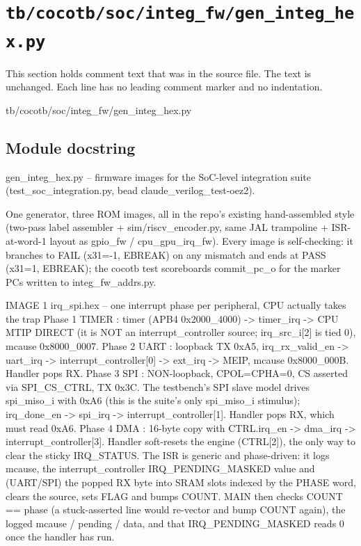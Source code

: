 \section{\texttt{tb/cocotb/soc/integ\_fw/gen\_integ\_hex.py}}\label{tm:suite:soc-integ-fw-gen-integ-hex}

This section holds comment text that was in the source file. The text is unchanged. Each line has no leading comment marker and no indentation.

\begin{relocated}{tb/cocotb/soc/integ_fw/gen_integ_hex.py}

\subsection*{Module docstring}

\begin{textblock}
gen_integ_hex.py -- firmware images for the SoC-level integration suite
(test_soc_integration.py, bead claude_verilog_test-oez2).

One generator, three ROM images, all in the repo's existing hand-assembled style
(two-pass label assembler + sim/riscv_encoder.py, same JAL trampoline + ISR-at-word-1
layout as gpio_fw / cpu_gpu_irq_fw).  Every image is self-checking: it branches to
FAIL (x31=-1, EBREAK) on any mismatch and ends at PASS (x31=1, EBREAK); the cocotb
test scoreboards commit_pc_o for the marker PCs written to integ_fw_addrs.py.

IMAGE 1  irq_spi.hex -- one interrupt phase per peripheral, CPU actually takes the trap
Phase 1 TIMER : timer (APB4 0x2000_4000) -> timer_irq -> CPU MTIP DIRECT (it is NOT an
interrupt_controller source; irq_src_i[2] is tied 0), mcause 0x8000_0007.
Phase 2 UART  : loopback TX 0xA5, irq_rx_valid_en -> uart_irq -> interrupt_controller[0]
-> ext_irq -> MEIP, mcause 0x8000_000B.  Handler pops RX.
Phase 3 SPI   : NON-loopback, CPOL=CPHA=0, CS asserted via SPI_CS_CTRL, TX 0x3C.  The
testbench's SPI slave model drives spi_miso_i with 0xA6 (this is the
suite's only spi_miso_i stimulus); irq_done_en -> spi_irq ->
interrupt_controller[1].  Handler pops RX, which must read 0xA6.
Phase 4 DMA   : 16-byte copy with CTRL.irq_en -> dma_irq -> interrupt_controller[3].
Handler soft-resets the engine (CTRL[2]), the only way to clear the
sticky IRQ_STATUS.
The ISR is generic and phase-driven: it logs mcause, the interrupt_controller
IRQ_PENDING_MASKED value and (UART/SPI) the popped RX byte into SRAM slots indexed by
the PHASE word, clears the source, sets FLAG and bumps COUNT.  MAIN then checks COUNT ==
phase (a stuck-asserted line would re-vector and bump COUNT again), the logged mcause /
pending / data, and that IRQ_PENDING_MASKED reads 0 once the handler has run.


\end{textblock}
\end{relocated}
